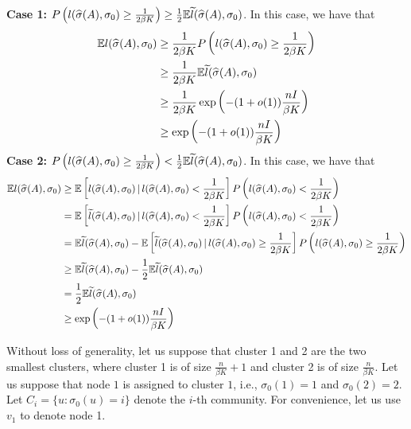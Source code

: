 \documentclass{article}
\begin{document}
\textbf{Case 1:} $P\left( l(\widehat{\sigma}(A), \sigma_0) \geq \frac{1}{2\beta K} \right) \geq \frac{1}{2} {\mathbb E} \widetilde{l}(\widehat{\sigma}(A), \sigma_0)$. In this case, we have that
\begin{align*}
{\mathbb E} l(\widehat{\sigma}(A), \sigma_0) &\geq \frac{1}{2 \beta K} P\left( l(\widehat{\sigma}(A), \sigma_0) \geq \frac{1}{2\beta K} \right) \\
     & \geq \frac{1}{2 \beta K}  {\mathbb E} \widetilde{l}(\widehat{\sigma}(A), \sigma_0) \\
     &\geq \frac{1}{2 \beta K} \exp \left( - (1+o(1)) \frac{nI}{\beta K} \right) \\
     &\geq \exp \left( - (1+o(1)) \frac{nI}{\beta K} \right) 
\end{align*}
\textbf{Case 2:}  $P\left( l(\widehat{\sigma}(A), \sigma_0) \geq \frac{1}{2\beta K} \right) < \frac{1}{2} {\mathbb E} \widetilde{l}(\widehat{\sigma}(A), \sigma_0)$. In this case, we have that
\begin{align*}
{\mathbb E} l(\widehat{\sigma}(A), \sigma_0) &\geq {\mathbb E}\left[ l(\widehat{\sigma}(A), \sigma_0) 
       {\,|\,} l(\widehat{\sigma}(A), \sigma_0) < \frac{1}{2 \beta K} \right] 
         P\left(  l(\widehat{\sigma}(A), \sigma_0) < \frac{1}{2 \beta K} \right) \\
  &= {\mathbb E}\left[ \widetilde{l}(\widehat{\sigma}(A), \sigma_0) 
       {\,|\,} l(\widehat{\sigma}(A), \sigma_0) < \frac{1}{2 \beta K}\right]
         P\left(  l(\widehat{\sigma}(A), \sigma_0) < \frac{1}{2 \beta K} \right) \\
  &= {\mathbb E} \widetilde{l}(\widehat{\sigma}(A), \sigma_0) -  
      {\mathbb E}\left[ \widetilde{l}(\widehat{\sigma}(A), \sigma_0) 
       {\,|\,} l(\widehat{\sigma}(A), \sigma_0) \geq \frac{1}{2 \beta K} \right] 
         P\left(  l(\widehat{\sigma}(A), \sigma_0) \geq \frac{1}{2 \beta K} \right) \\
  &\geq {\mathbb E} \widetilde{l}(\widehat{\sigma}(A), \sigma_0) - \frac{1}{2}  {\mathbb E} \widetilde{l}(\widehat{\sigma}(A), \sigma_0) \\
  &= \frac{1}{2}  {\mathbb E} \widetilde{l}(\widehat{\sigma}(A), \sigma_0) \\
  &\geq \exp\left( - (1 + o(1)) \frac{nI}{\beta K} \right)
\end{align*}




Without loss of generality, let us suppose that cluster 1 and 2 are the two smallest clusters, where cluster 1 is of size $\frac{n}{\beta K} + 1$ and cluster 2 is of size $\frac{n}{\beta K}$. Let us suppose that node $1$ is assigned to cluster $1$, i.e., $\sigma_0(1)= 1$ and $\sigma_0(2) = 2$. Let $C_i = \{u : \sigma_0(u) = i\}$ denote the $i$-th community. For convenience, let us use $v_1$ to denote node 1.\\
\end{document}
